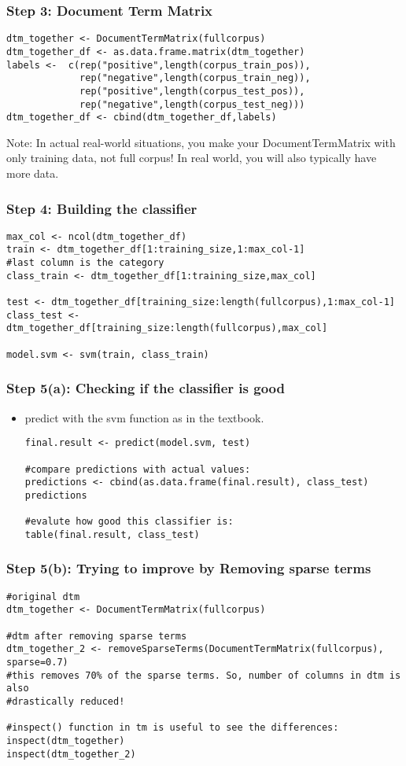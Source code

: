 \documentclass{beamer}
\begin{document}
\begin{frame}[fragile]
\frametitle{Step 3: Document Term Matrix}
\footnotesize
\begin{verbatim}
dtm_together <- DocumentTermMatrix(fullcorpus)
dtm_together_df <- as.data.frame.matrix(dtm_together) 
labels <-  c(rep("positive",length(corpus_train_pos)), 
             rep("negative",length(corpus_train_neg)),
             rep("positive",length(corpus_test_pos)),
             rep("negative",length(corpus_test_neg)))
dtm_together_df <- cbind(dtm_together_df,labels)
\end{verbatim}
Note: In actual real-world situations, you make your DocumentTermMatrix with only training data, not full corpus! In real world,
you will also typically have more data. 
\end{frame}

\begin{frame}[fragile]
\frametitle{Step 4: Building the classifier}
\footnotesize
\begin{verbatim}
max_col <- ncol(dtm_together_df)
train <- dtm_together_df[1:training_size,1:max_col-1] 
#last column is the category
class_train <- dtm_together_df[1:training_size,max_col]

test <- dtm_together_df[training_size:length(fullcorpus),1:max_col-1]
class_test <- dtm_together_df[training_size:length(fullcorpus),max_col]

model.svm <- svm(train, class_train)
\end{verbatim}
\end{frame}

\begin{frame}[fragile]
\frametitle{Step 5(a): Checking if the classifier is good}
\begin{itemize}
\item predict with the svm function as in the textbook.
\footnotesize
\begin{verbatim}
final.result <- predict(model.svm, test)

#compare predictions with actual values:
predictions <- cbind(as.data.frame(final.result), class_test)
predictions

#evalute how good this classifier is:
table(final.result, class_test)
\end{verbatim}
\end{itemize}
\end{frame}

\begin{frame}[fragile]
\frametitle{Step 5(b): Trying to improve by Removing sparse terms}
\scriptsize
\begin{verbatim}
#original dtm
dtm_together <- DocumentTermMatrix(fullcorpus)

#dtm after removing sparse terms
dtm_together_2 <- removeSparseTerms(DocumentTermMatrix(fullcorpus), sparse=0.7)
#this removes 70% of the sparse terms. So, number of columns in dtm is also
#drastically reduced!

#inspect() function in tm is useful to see the differences:
inspect(dtm_together)
inspect(dtm_together_2)
\end{verbatim}
\end{frame}
\end{document}
